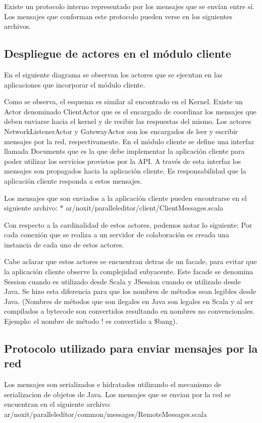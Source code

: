 \documentclass[12pt,a4paper]{article}
\begin{document}
Existe un protocolo interno representado por los mensajes que se envían entre sí. Los mensajes que conforman este protocolo
pueden verse en los siguientes archivos.

\subsection{Despliegue de actores en el módulo cliente}
En el siguiente diagrama se observan los actores que se ejecutan en las aplicaciones que incorporar el módulo cliente.


Como se observa, el esquema es similar al encontrado en el Kernel. Existe un Actor denominado ClientActor que es el
encargado de coordinar los mensajes que deben enviarse hacia el kernel y de recibir las respuestas del mismo.
Los actores NetworkListenerActor y GatewayActor son los encargados de leer y escribir mensajes por la red, respectivamente.
En el módulo cliente se define una interfaz llamada Documents que es la que debe implementar la aplicación cliente para poder
utilizar los servicios provistos por la API.
A través de esta interfaz los mensajes son propagados hacia la aplicación cliente. Es responsabilidad que la aplicación cliente
responda a estos mensajes.

Los mensajes que son enviados a la aplicación cliente pueden encontrarse en el siguiente archivo:
* ar/noxit/paralleleditor/client/ClientMessages.scala

Con respecto a la cardinalidad de estos actores, podemos notar lo siguiente:
Por cada conexión que se realiza a un servidor de colaboración es creada una instancia de cada uno de estos actores.

Cabe aclarar que estos actores se encuentran detras de un facade, para evitar que la aplicación cliente observe la
complejidad subyacente. Este facade se denomina Session cuando es utilizado desde Scala y JSession cuando es utilizado desde Java.
Se hizo esta diferencia para que los nombres de métodos sean legibles desde Java. (Nombres de métodos que son ilegales en Java son
legales en Scala y al ser compilados a bytecode son convertidos resultando en nombres no convencionales. Ejemplo: el nombre de 
método ! es convertido a \$bang).


\subsection{Protocolo utilizado para enviar mensajes por la red}
Los mensajes son serializados e hidratados utilizando el mecanismo de serializacion de objetos de Java. Los mensajes que se
envian por la red se encuentran en el siguiente archivo:
ar/noxit/paralleleditor/common/messages/RemoteMessages.scala
\end{document}
